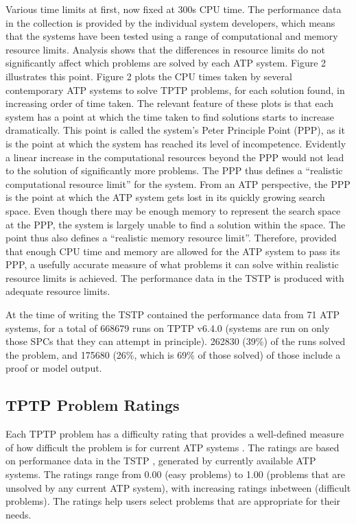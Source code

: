 \documentclass[runningheads]{llncs}
\begin{document}
Various time limits at first, now fixed at 300s CPU time.
The performance data in the collection is provided by the individual system developers, which 
means that the systems have been tested using a range of computational and memory resource limits. 
Analysis shows that the differences in resource limits do not significantly affect which problems 
are solved by each ATP system. Figure 2 illustrates this point.
Figure 2 plots the CPU times taken by several contemporary ATP systems to solve TPTP problems, 
for each solution found, in increasing order of time taken. 
The relevant feature of these plots is that each system has a point at which the time taken to 
find solutions starts to increase dramatically. 
This point is called the system's Peter Principle \cite{} Point (PPP), as it is the point at 
which the system has reached its level of incompetence. 
Evidently a linear increase in the computational resources beyond the PPP would not lead to the 
solution of significantly more problems. 
The PPP thus defines a ``realistic computational resource limit'' for the system. 
From an ATP perspective, the PPP is the point at which the ATP system gets lost in its quickly 
growing search space. 
Even though there may be enough memory to represent the search space at the PPP, the system is 
largely unable to find a solution within the space. 
The point thus also defines a ``realistic memory resource limit''. 
Therefore, provided that enough CPU time and memory are allowed for the ATP system to pass its 
PPP, a usefully accurate measure of what problems it can solve within realistic resource limits 
is achieved.
The performance data in the TSTP is produced with adequate resource limits.

At the time of writing the TSTP contained the performance data from 71 ATP
systems, for a total of 668679 runs on TPTP v6.4.0 (systems are run on only
those SPCs that they can attempt in principle).
262830 (39\%) of the runs solved the problem, and 175680 (26\%, which is
69\% of those solved) of those include a proof or model output.

\subsection{TPTP Problem Ratings}
\label{Ratings}

Each TPTP problem has a difficulty rating that provides a well-defined measure
of how difficult the problem is for current ATP systems \cite{SS01}.
The ratings are based on performance data in the TSTP \cite{Sut07-CSR},
generated by currently available ATP systems.
The ratings range from 0.00 (easy problems) to 1.00 (problems that are
unsolved by any current ATP system), with increasing ratings inbetween
(difficult problems).
The ratings help users select problems that are appropriate for their needs.
\end{document}

